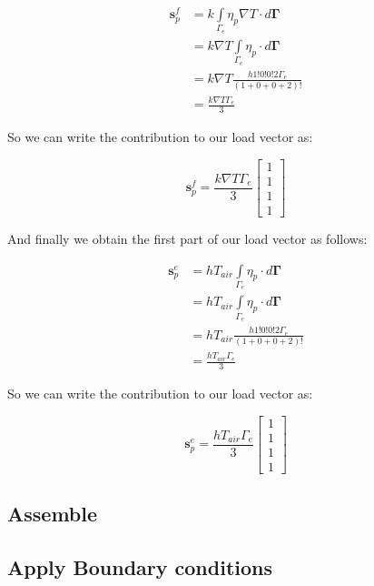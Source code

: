 \documentclass[12pt]{article}
\begin{document}
\begin{align*}
 \mathbf{s}_p^f &= k \int\limits_{\Gamma_{e}}{\eta_p\nabla T} \cdot d \mathbf{\Gamma} \\
 &= k \nabla T \int\limits_{\Gamma_{e}}{\eta_p} \cdot d \mathbf{\Gamma} \\
 &= k \nabla T \frac{h 1!0!0!2\Gamma_e}{(1+0+0+2)!} \\
 &= \frac{k\nabla T\Gamma_e}{3}
\end{align*}

So we can write the contribution to our load vector as:

\begin{equation}
\mathbf{s}_p^f = \frac{k\nabla T\Gamma_e}{3}
\begin{bmatrix} 1 \\ 1 \\ 1 \\ 1 
\end{bmatrix}
\end{equation}

And finally we obtain the first part of our load vector as follows:

\begin{align*}
 \mathbf{s}_p^e &= hT_{air} \int\limits_{\Gamma_{e}}{\eta_p} \cdot d \mathbf{\Gamma} \\
 &= hT_{air} \int\limits_{\Gamma_{e}}{\eta_p} \cdot d \mathbf{\Gamma} \\
 &= hT_{air} \frac{h 1!0!0!2\Gamma_e}{(1+0+0+2)!} \\
 &= \frac{hT_{air}\Gamma_e}{3}
\end{align*}

So we can write the contribution to our load vector as:

\begin{equation}
\mathbf{s}_p^e = \frac{hT_{air}\Gamma_e}{3}
\begin{bmatrix} 1 \\ 1 \\ 1 \\ 1 
\end{bmatrix}
\end{equation}

\subsection{Assemble}

\subsection{Apply Boundary conditions}
\end{document}
